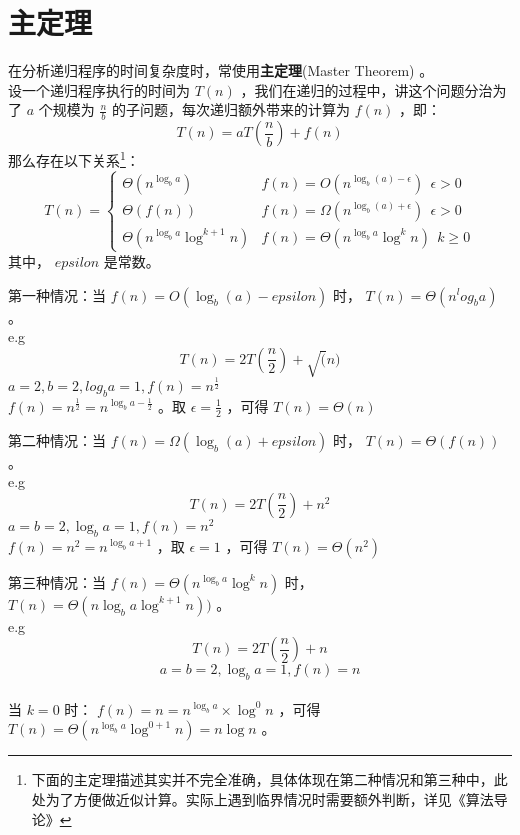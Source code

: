 \documentclass{beamer}
\newcommand{\fdf}[1]{\alert{\textbf{#1}}}
\begin{document}
\section{主定理}
\begin{frame}
在分析递归程序的时间复杂度时，常使用\fdf{主定理}(Master Theorem) 。 \\ 
设一个递归程序执行的时间为 $T(n)$ ，我们在递归的过程中，讲这个问题分治为了 $a$ 个规模为 $\frac{n}{b}$ 的子问题，每次递归额外带来的计算为 $f(n)$ ，即：
$$T(n) = a T(\frac{n}{b}) + f(n)$$
那么存在以下关系\footnote{下面的主定理描述其实并不完全准确，具体体现在第二种情况和第三种中，此处为了方便做近似计算。实际上遇到临界情况时需要额外判断，详见《算法导论》}：
$$T(n)  =  \left\{\begin{array}{ll}
\Theta(n^{\log_b a}) & f(n)  =  O(n^{\log_b (a) - \epsilon}) \ \  \epsilon > 0 \\
\Theta(f(n)) & f(n) = \Omega(n^{\log_b (a) + \epsilon}) \ \ \epsilon > 0 \\
\Theta(n^{\log_b a} \log ^{k + 1} n) & f(n) = \Theta(n^{\log_b a}\log^k n) \ \ k \geq 0
\end{array}\right.$$
其中， $epsilon$ 是常数。
\end{frame}
\begin{frame}
第一种情况：当 $f(n) = O(\log_b(a) - epsilon)$ 时， $T(n) = \Theta(n^log_b a)$ 。 \\ 
e.g
$$T(n) = 2T(\frac{n}{2}) + \sqrt(n)$$
$a = 2, b = 2, log_b a = 1, f(n) = n^{\frac{1}{2}}$ \\
$f(n) = n^{\frac{1}{2}} = n^{\log_b a - \frac{1}{2}}$ 。取 $\epsilon = \frac{1}{2}$ ，可得 $T(n) = \Theta(n)$
\end{frame}
\begin{frame}
第二种情况：当 $f(n) = \Omega(\log_b(a) + epsilon)$ 时， $T(n) = \Theta(f(n))$ 。 \\ 
e.g
$$T(n) = 2T(\frac{n}{2}) + n^2$$
$a = b = 2, \log_b a = 1, f(n) = n^2$ \\ 
$f(n) = n^2 = n^{\log_b a + 1}$ ，取 $\epsilon = 1$ ，可得 $T(n) = \Theta(n^2)$
\end{frame}
\begin{frame}
第三种情况：当 $f(n) = \Theta(n^{\log_b a} \log^k n)$ 时， $T(n) = \Theta(n{\log_b a} \log^{k + 1} n))$ 。\\ 
e.g
$$T(n) = 2T(\frac{n}{2}) + n$$
$$a = b = 2, \log_b a = 1, f(n) = n$$ \\ 
当 $k = 0$ 时： $f(n) = n = n^{\log_b a} \times \log^0n$ ，可得 $T(n) = \Theta(n^{\log_b a} \log^{0 + 1} n) = n\log n$ 。
\end{frame}
\end{document}
